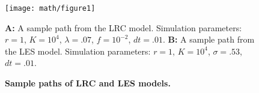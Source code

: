 %	
%	
%	
%	
%	
%	
%	
%	
%	
%	



\newpage
\begin{figure}
\centerline{
	\texttt{[image: math/figure1]}}
	\caption{\textbf{Sample paths of LRC and LES models.}}  {\textbf{A:}  A sample path from the LRC model.  Simulation parameters:  $r = 1$, $K = 10^4$, $\lambda = .07$, $f = 10^{-2}$, $dt = .01$.   \textbf{B:}   A sample path from the LES model.  Simulation parameters:  $r = 1$, $K = 10^4$, $\sigma = .53$, $dt = .01$.      }
\end{figure}


